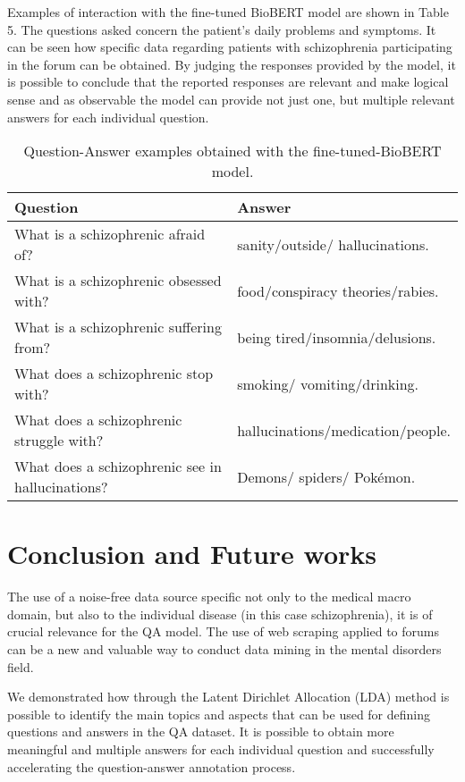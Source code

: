 \documentclass[runningheads]{llncs}
\begin{document}
Examples of interaction with the fine-tuned BioBERT model are shown in Table 5. The questions asked concern the patient's daily problems and symptoms. It can be seen how specific data regarding patients with schizophrenia participating in the forum can be obtained. By judging the responses provided by the model, it is possible to conclude that the reported responses are relevant and make logical sense and as observable the model can provide not just one, but multiple relevant answers for each individual question.

\begin{table}
 \centering
\caption{Question-Answer examples obtained with the fine-tuned-BioBERT model.}\label{tab1}
\begin{tabular}{|l|l|}
\hline
   Question & Answer \\
\hline
  What is a schizophrenic afraid of?    & sanity/outside/ hallucinations. \\ 
  What is a schizophrenic obsessed with?    & food/conspiracy theories/rabies.\\ 
  What is a schizophrenic suffering from? & being tired/insomnia/delusions.\\
  What does a schizophrenic stop with? & smoking/ vomiting/drinking.  \\ 
  What does a schizophrenic struggle with? & hallucinations/medication/people. \\
  What does a schizophrenic see in hallucinations? & Demons/ spiders/ Pokémon.  \\ 
  
\hline
\end{tabular}
\end{table}


\section{Conclusion and Future works}\label{sec:conclusion}
The use of a noise-free data source specific not only to the medical macro domain, but also to the individual disease (in this case schizophrenia), it is of crucial relevance for the QA model. The use of web scraping applied to forums can be a new and valuable way to conduct data mining in the mental disorders field.

We demonstrated how through the Latent Dirichlet Allocation (LDA) method is possible to identify the main topics and aspects that can be used for defining questions and answers in the QA dataset. It is possible to obtain more meaningful and multiple answers for each individual question and successfully accelerating the question-answer annotation process.
\end{document}
